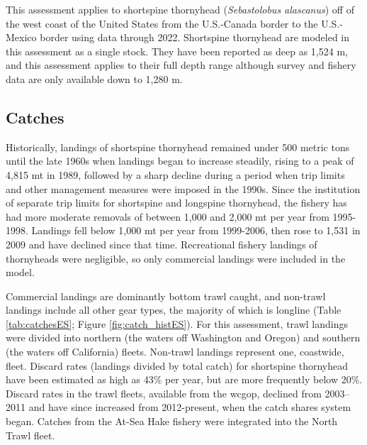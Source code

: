 \documentclass[11pt,
  english,
  letterpaper,
]{article}
\begin{document}
This assessment applies to shortspine thornyhead (\emph{Sebastolobus alascanus}) off of the west coast of the United States from the U.S.-Canada border to the U.S.-Mexico border using data through 2022. Shortspine thornyhead are modeled in this assessment as a single stock. They have been reported as deep as 1,524 m, and this assessment applies to their full depth range although survey and fishery data are only available down to 1,280 m.

\hypertarget{catches}{%
\subsection*{Catches}\label{catches}}

Historically, landings of shortspine thornyhead remained under 500 metric tons until the late 1960s when landings began to increase steadily, rising to a peak of 4,815 mt in 1989, followed by a sharp decline during a period when trip limits and other management measures were imposed in the 1990s. Since the institution of separate trip limits for shortspine and longspine thornyhead, the fishery has had more moderate removals of between 1,000 and 2,000 mt per year from 1995-1998. Landings fell below 1,000 mt per year from 1999-2006, then rose to 1,531 in 2009 and have declined since that time. Recreational fishery landings of thornyheads were negligible, so only commercial landings were included in the model.

Commercial landings are dominantly bottom trawl caught, and non-trawl landings include all other gear types, the majority of which is longline (Table \ref{tab:catchesES}; Figure \ref{fig:catch_histES}). For this assessment, trawl landings were divided into northern (the waters off Washington and Oregon) and southern (the waters off California) fleets. Non-trawl landings represent one, coastwide, fleet. Discard rates (landings divided by total catch) for shortspine thornyhead have been estimated as high as 43\% per year, but are more frequently below 20\%. Discard rates in the trawl fleets, available from the \gls{wcgop}, declined from 2003--2011 and have since increased from 2012-present, when the catch shares system began. Catches from the At-Sea Hake fishery were integrated into the North Trawl fleet.

\begingroup\fontsize{10}{12}\selectfont
\begingroup\fontsize{10}{12}\selectfont
\end{document}

